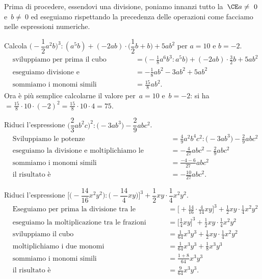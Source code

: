 Prima di procedere, essendovi una divisione, poniamo innanzi tutto
la~$\CE a \neq~0$ e~$b \neq~0$ ed eseguiamo rispettando la precedenza
delle operazioni come facciamo nelle espressioni numeriche.
\begin{exrig}
 \begin{esempio}
Calcola $\bigg(-{\dfrac{1}{2}}a^{2}b\bigg)^{3}:(a^{5}b)+(-2ab)\cdot\bigg(\dfrac{1}{2}b+b\bigg)+5ab^{2}$ per $a=10$ e $b=-2$.
 \begin{align*}
 &\text{sviluppiamo per prima il cubo} && = \bigg(-{\frac{1}{8}}a^{6}b^{3}:a^{5}b\bigg)+(-2ab)\cdot{\frac{3}{2}}b+5ab^{2} \\
 &\text{eseguiamo divisione e moltiplicazione} && = -{\frac{1}{8}}ab^{2}-3ab^{2}+5ab^{2}\\
 &\text{sommiamo i monomi simili} && = \frac{15}{8}ab^{2}.
 \end{align*}
 Ora è più semplice calcolarne il valore per~$a=10$ e~$b=-2$: si
 ha~$=\frac{15}{8}\cdot 10\cdot(-2)^{2}=\frac{15}{8}\cdot 10\cdot 4=75$.
 \end{esempio}

 \begin{esempio}
Riduci l'espressione $\bigg(\dfrac{2}{3}ab^{2}c\bigg)^{2}:\big(-3ab^{3}\big)-\dfrac{2}{9}abc^{2}$.
 \begin{align*}
 &\text{Sviluppiamo le potenze} && = \frac{4}{9}a^{2}b^{4}c^{2}:\big(-3ab^{3}\big)-\frac{2}{9}abc^{2}\\
 &\text{eseguiamo la divisione e moltiplichiamo le frazioni} && = -{\frac{4}{27}}abc^{2}-\frac{2}{9}abc^{2}\\
 &\text{sommiamo i monomi simili} && = \frac{-4-6}{27}abc^{2}\\
 &\text{il risultato è} && = -{\frac{10}{27}}abc^{2}.
 \end{align*}
 \end{esempio}

 \begin{esempio}
Riduci l'espressione $\Bigg[\bigg(-{\dfrac{14}{16}}x^{2}y^{2}\bigg):\bigg(-{\dfrac{14}{4}}xy\bigg)\Bigg]^{3}+\dfrac{1}{2}xy\cdot{\dfrac{1}{4}}x^{2}y^{2}$.
 \begin{align*}
 &\text{Eseguiamo per prima la divisione tra le parentesi quadre} && = \bigg[+{\frac{14}{16}}\cdot{\frac{4}{14}}xy\bigg]^{3}+\frac{1}{2}xy\cdot {\frac{1}{4}}x^{2}y^{2}\\
 &\text{eseguiamo la moltiplicazione tra le frazioni} && = \bigg[\frac{1}{4}xy\bigg]^{3}+\frac{1}{2}xy\cdot{\frac{1}{4}}x^{2}y^{2}\\
 &\text{sviluppiamo il cubo} && = \frac{1}{64}x^{3}y^{3}+\frac{1}{2}xy\cdot {\frac{1}{4}}x^{2}y^{2}\\
 &\text{moltiplichiamo i due monomi} && = \frac{1}{64}x^{3}y^{3}+\frac{1}{8}x^{3}y^{3}\\
 &\text{sommiamo i monomi simili} && = \frac{1+8}{64}x^{3}y^{3}\\
 &\text{il risultato è} && = \frac{9}{64}x^{3}y^{3}.
\end{align*}
 \end{esempio}
\end{exrig}


